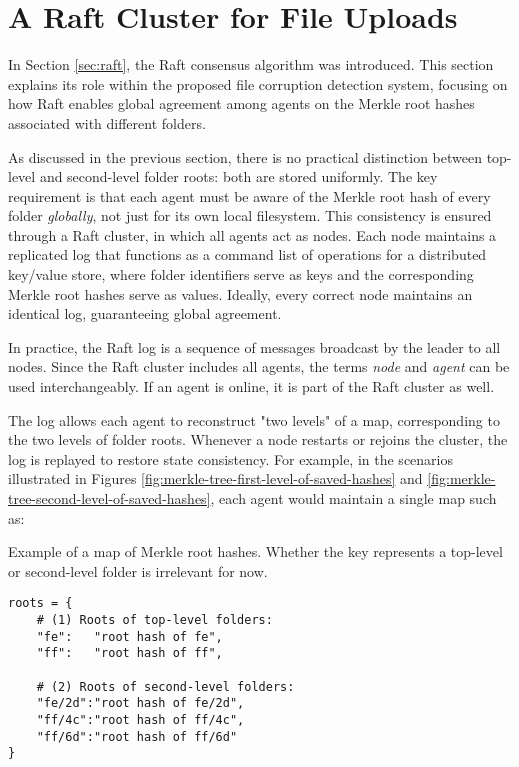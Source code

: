 \section{A Raft Cluster for File Uploads}

In Section \ref{sec:raft}, the Raft consensus algorithm was introduced. This section explains its role within the proposed file corruption detection system, focusing on how Raft enables global agreement among agents on the Merkle root hashes associated with different folders.

As discussed in the previous section, there is no practical distinction between top-level and second-level folder roots: both are stored uniformly. The key requirement is that each agent must be aware of the Merkle root hash of every folder \emph{globally}, not just for its own local filesystem. This consistency is ensured through a Raft cluster, in which all agents act as nodes. Each node maintains a replicated log that functions as a command list of operations for a distributed key/value store, where folder identifiers serve as keys and the corresponding Merkle root hashes serve as values. Ideally, every correct node maintains an identical log, guaranteeing global agreement.

In practice, the Raft log is a sequence of messages broadcast by the leader to all nodes. Since the Raft cluster includes all agents, the terms \emph{node} and \emph{agent} can be used interchangeably. If an agent is online, it is part of the Raft cluster as well.

The log allows each agent to reconstruct "two levels" of a map, corresponding to the two levels of folder roots. Whenever a node restarts or rejoins the cluster, the log is replayed to restore state consistency. For example, in the scenarios illustrated in Figures \ref{fig:merkle-tree-first-level-of-saved-hashes} and \ref{fig:merkle-tree-second-level-of-saved-hashes}, each agent would maintain a single map such as:

\begin{listing}[H]
\caption{Example of a map of Merkle root hashes. Whether the key represents a top-level or second-level folder is irrelevant for now.}
\label{code:map-of-roots}
\begin{verbatim}
roots = {
    # (1) Roots of top-level folders:
    "fe":   "root hash of fe",
    "ff":   "root hash of ff",
    
    # (2) Roots of second-level folders:
    "fe/2d":"root hash of fe/2d",
    "ff/4c":"root hash of ff/4c",
    "ff/6d":"root hash of ff/6d"
}
\end{verbatim}
\end{listing}

